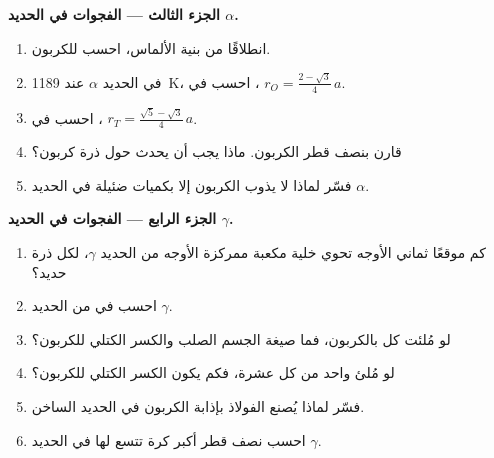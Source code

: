 \begin{problem}
\medskip
\noindent\textbf{الجزء الثالث --- الفجوات في الحديد $\alpha$.}
\begin{enumerate}[resume]
  \item انطلاقًا من بنية الألماس، احسب  للكربون.
  \item في الحديد $\alpha$  عند \qty{1189}{K}، احسب 
        في ، $r_O = \frac{2 - \sqrt3}{4}\,a$.
  \item احسب  في ، $r_T = \frac{\sqrt5 -
        \sqrt3}{4}\,a$.
  \item قارن بنصف قطر الكربون. ماذا يجب أن يحدث
         حول ذرة كربون؟
  \item فسّر لماذا لا يذوب الكربون إلا بكميات ضئيلة في
        الحديد $\alpha$.
\end{enumerate}

\medskip
\noindent\textbf{الجزء الرابع --- الفجوات في الحديد $\gamma$.}
\begin{enumerate}[resume]
  \item كم موقعًا ثماني الأوجه تحوي خلية مكعبة ممركزة الأوجه من الحديد $\gamma$،
        لكل ذرة حديد؟
  \item احسب  في  من الحديد $\gamma$.
  \item لو مُلئت كل  بالكربون، فما
        صيغة الجسم الصلب والكسر الكتلي للكربون؟
  \item لو مُلئ  واحد من كل عشرة، فكم يكون الكسر
        الكتلي للكربون؟
  \item فسّر لماذا يُصنع الفولاذ بإذابة الكربون في الحديد الساخن.
  \item احسب نصف قطر أكبر كرة تتسع لها
         في الحديد $\gamma$.
\end{enumerate}
\end{problem}
